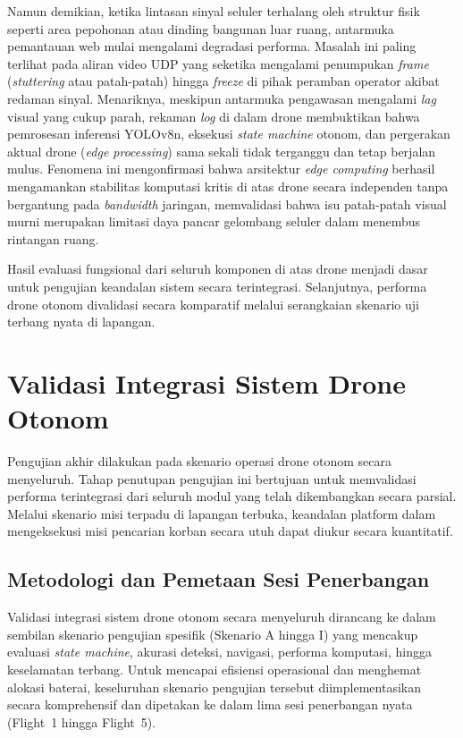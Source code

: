 Namun demikian, ketika lintasan sinyal seluler terhalang oleh struktur fisik seperti area pepohonan atau dinding bangunan luar ruang, antarmuka pemantauan web mulai mengalami degradasi performa. Masalah ini paling terlihat pada aliran video UDP yang seketika mengalami penumpukan \textit{frame} (\textit{stuttering} atau patah-patah) hingga \textit{freeze} di pihak peramban operator akibat redaman sinyal. Menariknya, meskipun antarmuka pengawasan mengalami \textit{lag} visual yang cukup parah, rekaman \textit{log} di dalam drone membuktikan bahwa pemrosesan inferensi YOLOv8n, eksekusi \textit{state machine} otonom, dan pergerakan aktual drone (\textit{edge processing}) sama sekali tidak terganggu dan tetap berjalan mulus. Fenomena ini mengonfirmasi bahwa arsitektur \textit{edge computing} berhasil mengamankan stabilitas komputasi kritis di atas drone secara independen tanpa bergantung pada \textit{bandwidth} jaringan, memvalidasi bahwa isu patah-patah visual murni merupakan limitasi daya pancar gelombang seluler dalam menembus rintangan ruang.

Hasil evaluasi fungsional dari seluruh komponen di atas drone menjadi dasar untuk pengujian keandalan sistem secara terintegrasi. Selanjutnya, performa drone otonom divalidasi secara komparatif melalui serangkaian skenario uji terbang nyata di lapangan.

\section{Validasi Integrasi Sistem Drone Otonom}

Pengujian akhir dilakukan pada skenario operasi drone otonom secara menyeluruh. Tahap penutupan pengujian ini bertujuan untuk memvalidasi performa terintegrasi dari seluruh modul yang telah dikembangkan secara parsial. Melalui skenario misi terpadu di lapangan terbuka, keandalan platform dalam mengeksekusi misi pencarian korban secara utuh dapat diukur secara kuantitatif.

\subsection{Metodologi dan Pemetaan Sesi Penerbangan}

Validasi integrasi sistem drone otonom secara menyeluruh dirancang ke dalam sembilan skenario pengujian spesifik (Skenario A hingga I) yang mencakup evaluasi \textit{state machine}, akurasi deteksi, navigasi, performa komputasi, hingga keselamatan terbang. Untuk mencapai efisiensi operasional dan menghemat alokasi baterai, keseluruhan skenario pengujian tersebut diimplementasikan secara komprehensif dan dipetakan ke dalam lima sesi penerbangan nyata (Flight~1 hingga Flight~5). 

